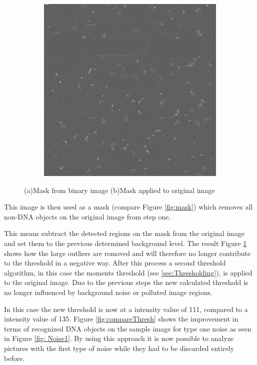 \begin{figure}[!htb]
\begin{subfigure}{0.5\textwidth}
		\includegraphics[width=\linewidth]{filtered.png}
		\caption{}
		\label{fig:filtered}
	\end{subfigure}%
	
	\caption{(a)Mask from binary image (b)Mask applied to original image}\label{fig:Process}
\end{figure}
This image is then used as a mask (compare Figure \ref{fig:mask}) which removes all non-DNA objects on the original image from step one.

This means subtract the detected regions on the mask from the original image and set them to the previous determined background level.
The result Figure \ref{fig:filtered} shows how the large outliers are removed and will therefore no longer contribute to the threshold in a negative way.
After this process a second threshold algorithm, in this case the moments threshold (see \ref{sec:Thresholding}), is applied to the original image. 
Duo to the previous steps the new calculated threshold is no longer influenced by background noise or polluted image regions.

In this case the new threshold is now at a intensity value of 111, compared to a intensity value of 135. Figure \ref{fig:compareThresh} shows the improvement in terms of recognized DNA objects on the sample image for type one noise as seen in Figure \ref{fig: Noise1}.
By using this approach it is now possible to analyze pictures with the first type of noise while they had to be discarded entirely before.


